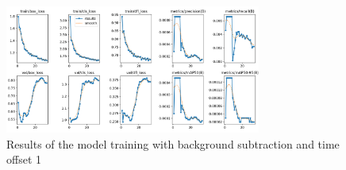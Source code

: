 \begin{figure}[htbp] 
    \centering
    \includegraphics[width=0.75\textwidth]{images/results/bgsub_timeoffset1_results.png}
    \caption{Results of the model training with background subtraction and time offset 1}
    \label{fig:results_bgsub_timeoffset1}
\end{figure}

